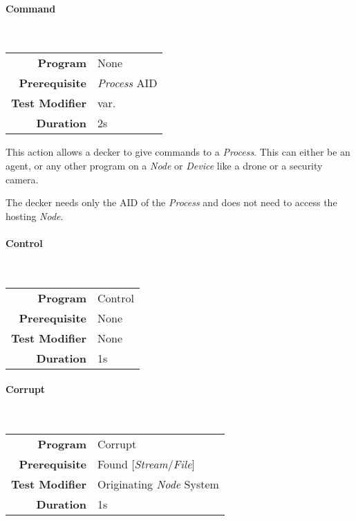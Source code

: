 \hfill


\paragraph{Command}
\label{par: command}

\mbox{}\\

\begin{tabular}{rl}
    \textbf{Program}       & None               \\
    \textbf{Prerequisite}  & \emph{Process} AID \\
    \textbf{Test Modifier} & var.               \\
    \textbf{Duration}      & 2s                 \\
\end{tabular}

\hfill

This action allows a decker to give commands to a \emph{Process}. This can either be an agent,
or any other program on a \emph{Node} or \emph{Device} like a drone or a security camera.

The decker needs only the AID of the \emph{Process} and does not need to access the hosting
\emph{Node}.

\paragraph{Control}
\label{par: control}

\mbox{}\\

\begin{tabular}{rl}
    \textbf{Program}       & Control \\
    \textbf{Prerequisite}  & None    \\
    \textbf{Test Modifier} & None    \\
    \textbf{Duration}      & 1s      \\
\end{tabular}

\hfill

\paragraph{Corrupt}
\label{par: corrupt action}

\mbox{}\\

\begin{tabular}{rl}
    \textbf{Program}       & Corrupt                           \\
    \textbf{Prerequisite}  & Found [\emph{Stream}/\emph{File}] \\
    \textbf{Test Modifier} & Originating \emph{Node} System    \\
    \textbf{Duration}      & 1s                                \\
\end{tabular}

